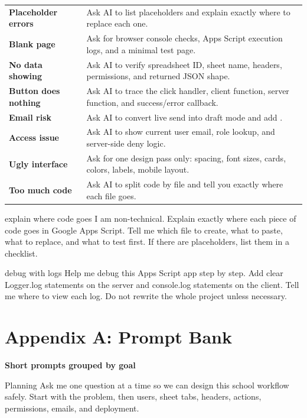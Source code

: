 \documentclass[10pt]{article}
\newcommand{\code}[1]{\texttt{\detokenize{#1}}}
\newcommand{\sectionkicker}[1]{\vspace{0.2em}{\small\bfseries\color{GCTeal}#1}\vspace{-0.15em}}
\newcommand{\tighttitle}[1]{{\Large\bfseries\color{GCNavy}#1}\par}
\begin{document}
\begin{longtable}{p{}p{}}
\textbf{Placeholder errors} & Ask AI to list placeholders and explain exactly where to replace each one. \\
\textbf{Blank page} & Ask for browser console checks, Apps Script execution logs, and a minimal test page. \\
\textbf{No data showing} & Ask AI to verify spreadsheet ID, sheet name, headers, permissions, and returned JSON shape. \\
\textbf{Button does nothing} & Ask AI to trace the click handler, client function, server function, and success/error callback. \\
\textbf{Email risk} & Ask AI to convert live send into draft mode and add \code{TEST_MODE}. \\
\textbf{Access issue} & Ask AI to show current user email, role lookup, and server-side deny logic. \\
\textbf{Ugly interface} & Ask for one design pass only: spacing, font sizes, cards, colors, labels, mobile layout. \\
\textbf{Too much code} & Ask AI to split code by file and tell you exactly where each file goes. \\
\end{longtable}

\begin{promptbox}{explain where code goes}
I am non-technical. Explain exactly where each piece of code goes in Google Apps Script. Tell me which file to create, what to paste, what to replace, and what to test first. If there are placeholders, list them in a checklist.
\end{promptbox}

\begin{promptbox}{debug with logs}
Help me debug this Apps Script app step by step. Add clear Logger.log statements on the server and console.log statements on the client. Tell me where to view each log. Do not rewrite the whole project unless necessary.
\end{promptbox}

\section{Appendix A: Prompt Bank}
\sectionkicker{FAST STARTERS}
\tighttitle{Short prompts grouped by goal}

\begin{textbox}{Planning}
Ask me one question at a time so we can design this school workflow safely. Start with the problem, then users, sheet tabs, headers, actions, permissions, emails, and deployment.
\end{textbox}
\end{document}
